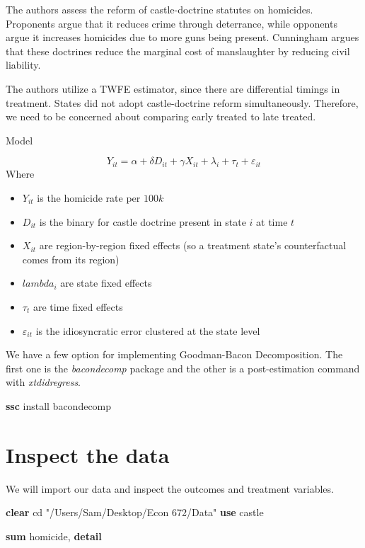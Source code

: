 \documentclass[
]{book}
\newenvironment{Shaded}{\begin{snugshade}}{\end{snugshade}}
\newcommand{\KeywordTok}[1]{\textcolor[rgb]{0.13,0.29,0.53}{\textbf{#1}}}
\newcommand{\NormalTok}[1]{#1}
\newcommand{\StringTok}[1]{\textcolor[rgb]{0.31,0.60,0.02}{#1}}
\providecommand{\tightlist}{%
  \setlength{\itemsep}{0pt}\setlength{\parskip}{0pt}}
\begin{document}
The authors assess the reform of castle-doctrine statutes on homicides. Proponents argue that it reduces crime through deterrance, while opponents argue it increases homicides due to more guns being present. Cunningham argues that these doctrines reduce the marginal cost of manslaughter by reducing civil liability.

The authors utilize a TWFE estimator, since there are differential timings in treatment. States did not adopt castle-doctrine reform simultaneously. Therefore, we need to be concerned about comparing early treated to late treated.

Model

\[ Y_{it}=\alpha+\delta D_{it} + \gamma X_{it} + \lambda_{i} + \tau_{t}+\varepsilon_{it} \]
Where

\begin{itemize}
\tightlist
\item
  \(Y_{it}\) is the homicide rate per \(100k\)
\item
  \(D_{it}\) is the binary for castle doctrine present in state \(i\) at time \(t\)
\item
  \(X_{it}\) are region-by-region fixed effects (so a treatment state's counterfactual comes from its region)
\item
  \(lambda_{i}\) are state fixed effects
\item
  \(\tau_{t}\) are time fixed effects
\item
  \(\varepsilon_{it}\) is the idiosyncratic error clustered at the state level
\end{itemize}

We have a few option for implementing Goodman-Bacon Decomposition. The first one is the \emph{bacondecomp} package and the other is a post-estimation command with \emph{xtdidregress}.

\begin{Shaded}
\begin{Highlighting}[]
\KeywordTok{ssc}\NormalTok{ install bacondecomp}
\end{Highlighting}
\end{Shaded}

\section{Inspect the data}\label{inspect-the-data}

We will import our data and inspect the outcomes and treatment variables.

\begin{Shaded}
\begin{Highlighting}[]
\KeywordTok{clear}
\NormalTok{cd }\StringTok{"/Users/Sam/Desktop/Econ 672/Data"}
\KeywordTok{use}\NormalTok{ castle}

\KeywordTok{sum}\NormalTok{ homicide, }\KeywordTok{detail}
\end{Highlighting}
\end{Shaded}
\end{document}
